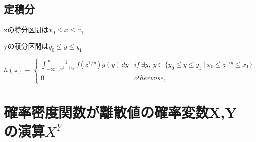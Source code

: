 \documentclass[a4paper,11pt]{ltjsarticle}
\begin{document}
\subsection{定積分}
\begin{description}
    \item xの積分区間は$x_0 \leq x \leq x_1$
    \item yの積分区間は$y_0 \leq y \leq y_1$
\end{description}
$$
    h(z)=
    \begin{cases}
        \int_{-\infty}^{\infty} \frac{1}{|yz^{1-1/y}|} f(z^{1/y}) g(y) \, dy    & if\ \exists y,\  y\in \{ y_0 \leq y \leq y_1 \ | \ x_0 \leq z^{1/y} \leq x_1 \}\\
        0                                                                       & otherwise,
    \end{cases}
$$
\newpage

\section{確率密度関数が離散値の確率変数X,Yの演算$X^Y$}
\end{document}
